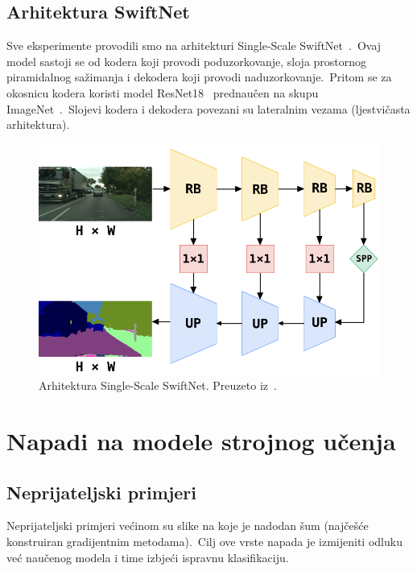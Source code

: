 \documentclass[times, utf8, seminar, numeric]{fer}
\begin{document}
\section{Arhitektura SwiftNet}

Sve eksperimente provodili smo na arhitekturi Single-Scale SwiftNet~\cite{orvsic2021efficient}.\ Ovaj model sastoji se od kodera koji provodi poduzorkovanje, sloja prostornog piramidalnog sažimanja i dekodera koji provodi naduzorkovanje.\ 
Pritom se za okosnicu kodera koristi model ResNet18~\cite{he2016deep} prednaučen na skupu ImageNet~\cite{deng2009imagenet}.\ Slojevi kodera i dekodera povezani su lateralnim vezama (ljestvičasta arhitektura).\

\begin{figure}[htb]
    \centering
    \includegraphics[scale=0.425]{./Slike/swiftnet.png}
    \caption{Arhitektura Single-Scale SwiftNet. Preuzeto iz~\cite{orvsic2021efficient}.}
    \label{fig:swiftnet}
\end{figure}

\chapter{Napadi na modele strojnog učenja}

\section{Neprijateljski primjeri}

Neprijateljski primjeri većinom su slike na koje je nadodan šum (najčešće konstruiran gradijentnim metodama).\ Cilj ove vrste napada je izmijeniti odluku već naučenog modela i time izbjeći ispravnu klasifikaciju.
\end{document}
